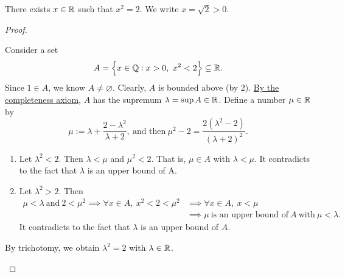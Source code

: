 \documentclass[11pt,openany]{article}
\begin{document}
\vfill
\begin{note}
	There exists $x\in\mathbb{R}$ such that $x^2=2$. We write $x=\sqrt{2}>0$.
	\begin{proof}
		\textcolor{gray!50}{Consider a set \[
		A=\set{x\in\Q:x>0,\ x^2<2}\subseteq\R.
		\] Since $1\in A$, we know $A\neq\varnothing$. Clearly, $A$ is bounded above (by 2). \underline{By the completeness axiom}, $A$ has the supremum $\lambda=\sup A\in\mathbb{R}$.
		Define a number $\mu\in\mathbb{R}$ by\[
		\mu:=\lambda+\frac{2-\lambda^2}{\lambda+2},\ \text{and then}\ \mu^2-2=\frac{2(\lambda^2-2)}{(\lambda+2)^2}.
		\] \begin{enumerate}
			\item Let $\lambda^2<2$. Then $\lambda <\mu$ and $\mu^2<2$. That is, $\mu\in A$ with $\lambda <\mu$.
			It contradicts to the fact that $\lambda$ is an upper bound of A.
			\item Let $\lambda^2>2$. Then \begin{align*}
				\mu<\lambda\ \text{and}\ 2 < \mu^2 \implies \forall x\in A,\ x^2<2<\mu^2
				&\implies \forall x\in A,\ x<\mu\\
				&\implies \mu\ \text{is an upper bound of}\ A\ \text{with}\ \mu <\lambda.
			\end{align*} It contradicts to the fact that $\lambda$ is an upper bound of $A$.
		\end{enumerate} By trichotomy, we obtain $\lambda^2=2$ with $\lambda\in\mathbb{R}$.}
	\end{proof}
\end{note}
\newpage
{}
\end{document}
